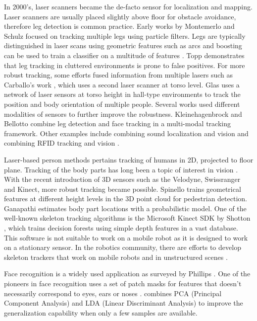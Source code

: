 In 2000's, laser scanners became the de-facto sensor for localization and mapping. Laser scanners are usually placed slightly above floor for obstacle avoidance, therefore leg detection is common practice. Early works by Montemerlo \cite{montemerlo2002conditional} and Schulz \cite{schulz2001tracking} focused on tracking multiple legs using particle filters. Legs are typically distinguished in laser scans using geometric features such as arcs \cite{xavier2005fast} and boosting can be used to train a classifier on a multitude of features \cite{arras2007using}. Topp \cite{topp2005tracking} demonstrates that leg tracking in cluttered environments is prone to false positives. For more robust tracking, some efforts fused information from multiple lasers such as Carballo's work \cite{Carballo2008}, which uses a second laser scanner at torso level. Glas \cite{glas2009laser} uses a network of laser sensors at torso height in hall-type environments to track the position and body orientation of multiple people. Several works used different modalities of sensors to further improve the robustness. Kleinehagenbrock \cite{kleinehagenbrock2002person} and Bellotto \cite{bellotto2009multisensor} combine leg detection and face tracking in a multi-modal tracking framework. Other examples include combining sound localization and vision \cite{bernardin2007audio} and combining RFID tracking and vision \cite{germa2010vision}.

Laser-based person methods pertains tracking of humans in 2D, projected to floor plane. Tracking of the body parts has long been a topic of interest in vision \cite{baumberg1997learning,sidenbladh2000stochastic}. With the recent introduction of 3D sensors such as the Velodyne, Swissranger and Kinect, more robust tracking became possible. Spinello \cite{spinello2010layered} trains geometrical features at different height levels in the 3D point cloud for pedestrian detection. Ganapathi \cite{ganapathi2010real} estimates body part locations with a probabilistic model. One of the well-known skeleton tracking algorithms is the Microsoft Kinect SDK by Shotton \cite{shotton2013real}, which trains decision forests using simple depth features in a vast database. This software is not suitable to work on a mobile robot as it is designed to work on a stationary sensor. In the robotics community, there are efforts to develop skeleton trackers that work on mobile robots and in unstructured scenes \cite{buys2013adaptable}.

Face recognition is a widely used application as surveyed by Phillips \cite{phillips2005overview}. One of the pioneers in face recognition uses a set of patch masks for features that doesn't necessarily correspond to eyes, ears or noses \cite{turk1991face}. \cite{zhao1998discriminant} combines PCA (Principal Component Analysis) and LDA (Linear Discriminant Analysis) to improve the generalization capability when only a few samples are available.

